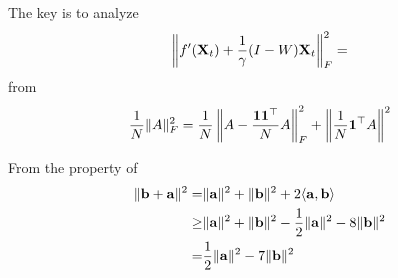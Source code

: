 The key is to analyze 
\begin{align*}
\left\|f'({\bf X}_t) + {1\over \gamma}(I-W){\bf X}_t\right\|^2_F = 
\end{align*}
from 
\[
{1\over N}\|A\|^2_F = {1\over N} \left\|A - {{\bf 1}{\bf 1}^\top\over N}A\right\|^2_F + \left\|{1\over N} {\bf 1}^\top A\right\|^2
\]

From the property of 
\begin{align*}
\|{\bf b} + {\bf a}\|^2 = & \|{\bf a}\|^2 + \|{\bf b}\|^2 + 2\langle {\bf a}, {\bf b}\rangle 
\\ \geq & 
\|{\bf a}\|^2 + \|{\bf b}\|^2- {1\over 2}\|{\bf a}\|^2 - 8\|{\bf b}\|^2
\\ = &
{1\over 2}\|{\bf a}\|^2 - 7\|{\bf b}\|^2
\end{align*}





